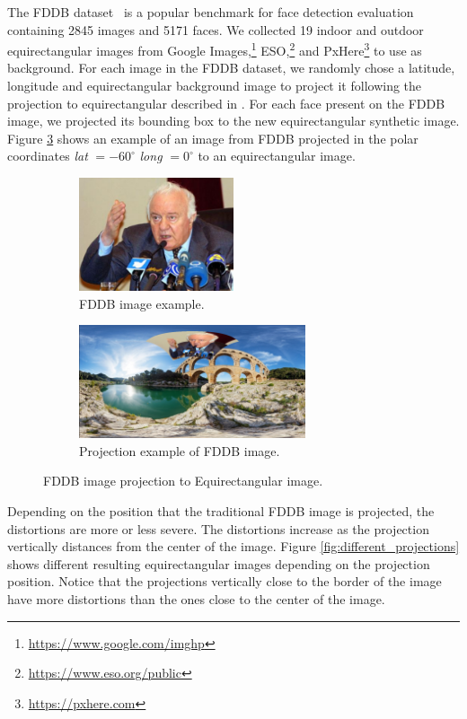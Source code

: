 The FDDB dataset~\cite{jain2010fddb} is a popular benchmark for face detection evaluation containing 2845 images and 5171 faces. We collected 19 indoor and outdoor equirectangular images from Google Images,\footnote{\url{https://www.google.com/imghp}} ESO,\footnote{\url{https://www.eso.org/public}} and PxHere\footnote{\url{https://pxhere.com}} to use as background.
For each image in the FDDB dataset, we randomly chose a latitude, longitude and equirectangular background image to project it following the projection to equirectangular described in \cite{su2017learning}.
For each face present on the FDDB image, we projected its bounding box to the new equirectangular synthetic image. Figure \ref{fig:authoring_fddb_proj} shows an example of an image from FDDB projected in the polar coordinates \emph{lat} $ = -60^{\circ}$ \emph{long} $ = 0^{\circ}$ to an equirectangular image.

\begin{figure}[!ht]
\centering
    \begin{subfigure}{0.4\linewidth}
        \centering
        \includegraphics[height=9em]{img/video360/face_pre.png}
        \caption{FDDB image example.}
        \label{subfig:face_pre}
    \end{subfigure}\hfill
    \begin{subfigure}{0.55\linewidth}
        \centering
         \includegraphics[height=9em]{img/video360/face_pos.png}
        \caption{Projection example of FDDB image.}
        \label{subfig:face_pos}
    \end{subfigure}

\caption{FDDB image projection to Equirectangular image.}
\label{fig:authoring_fddb_proj}
\end{figure}

Depending on the position that the traditional FDDB image is projected, the distortions are more or less severe. The distortions increase as the projection vertically distances from the center of the image. Figure \ref{fig:different_projections} shows different resulting equirectangular images depending on the projection position. Notice that the projections vertically close to the border of the image have more distortions than the ones close to the center of the image.

